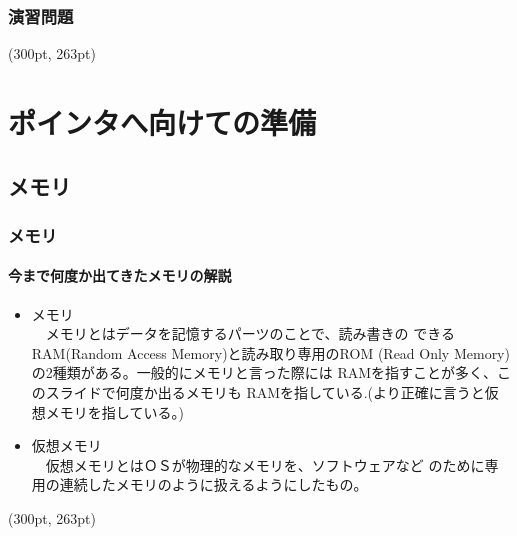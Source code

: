 \documentclass[dvipdfmx]{beamer}
\begin{document}
\begin{frame}[t, fragile]
    \frametitle{演習問題}
    \begin{textblock*}{0.3\linewidth}(300pt, 263pt)
        \space
    \end{textblock*}
\end{frame}

\section{ポインタへ向けての準備}
\subsection{メモリ}
\begin{frame}[t, fragile]
    \frametitle{メモリ}
    \framesubtitle{今まで何度か出てきたメモリの解説}
    \begin{itemize}
        \item メモリ\\
        　メモリとはデータを記憶するパーツのことで、読み書きの
        できるRAM(Random Access Memory)と読み取り専用のROM
        (Read Only Memory)の2種類がある。一般的にメモリと言った際には
        RAMを指すことが多く、このスライドで何度か出るメモリも
        RAMを指している.(より正確に言うと仮想メモリを指している。)
        \item 仮想メモリ\\
        　仮想メモリとはＯＳが物理的なメモリを、ソフトウェアなど
        のために専用の連続したメモリのように扱えるようにしたもの。
    \end{itemize}
    \begin{textblock*}{0.3\linewidth}(300pt, 263pt)
        \space
    \end{textblock*}
\end{frame}
\end{document}
